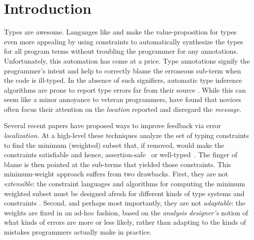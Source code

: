 \section{\textbf{Introduction}}
\label{sec:introduction}

%
Types are awesome.
%
Languages like \ocaml and \haskell make
the value-proposition for types even more
appealing by using constraints to automatically
synthesize the types for all program terms
without troubling the programmer for any
annotations.
%
Unfortunately, this automation has come at a price.
Type annotations signify
the programmer's intent and help to correctly
blame the erroneous sub-term when the code is
ill-typed.
%
In the absence of such signifiers, automatic
type inference algorithms are prone to report
type errors far from their source
\citep{Wand1986-nw}.
%
While this can seem like a minor annoyance to
veteran programmers, \citet{Joosten1993-yx} have found
that novices often focus their attention on the \emph{location}
reported and disregard the \emph{message}.

%
Several recent papers have proposed ways
to improve feedback via error \emph{localization}.
%
At a high-level these techniques analyze
the set of typing constraints to find
the minimum (weighted) subset that,
if removed, would make the constraints
satisfiable and hence, assertion-safe~\citep{Jose:2011}
or well-typed~\citep{Zhang2014-lv,Loncaric2016-uk,Chen2014-gd,Pavlinovic2014-mr}.
The finger of blame is then pointed at the
sub-terms that yielded those constraints.
%
This minimum-weight approach suffers
from two drawbacks.
%
First, they are not \emph{extensible}:
the constraint languages and algorithms for computing
the minimum weighted subset must be
designed afresh for different kinds
of type systems and constraints \citep{Loncaric2016-uk}.
%
Second, and perhaps most importantly,
they are not \emph{adaptable}: the
weights are fixed in an ad-hoc fashion, based on the
\emph{analysis designer's} notion
of what kinds of errors are more
or less likely, rather than
adapting to the kinds of mistakes
programmers actually make in practice.

